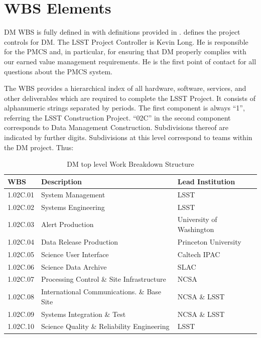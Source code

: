 \section{WBS Elements } \label{sect:WBS}

DM WBS is fully defined in  with definitions provided in . 
 defines the project controls for DM. The LSST Project Controller is Kevin Long. He is responsible for the PMCS and, in particular, for ensuring that DM properly complies with
our earned value management requirements. He is the first point of contact for
all questions about the PMCS system.


The WBS provides a hierarchical index of all hardware, software, services, and
other deliverables which are required to complete the LSST Project. It
consists of alphanumeric strings separated by periods. The first component is
always “1”, referring the LSST Construction Project. “02C” in the second
component corresponds to Data Management Construction. Subdivisions thereof
are indicated by further digits. Subdivisions at this level correspond to
teams within the DM project. Thus:

\begin{table}
\caption{DM top level Work Breakdown Structure \label{tab:wbs}}
\begin{tabular}[htb]{l|l|l}\\ \hline
{\bf WBS}    &  {\bf Description}   &                            {\bf Lead Institution}\\ \hline
	1.02C.01& System Management                       &  LSST\\ \hline
	1.02C.02& Systems Engineering                     &  LSST\\ \hline
	1.02C.03& Alert Production                        &  University of Washington\\ \hline
	1.02C.04& Data Release Production                 &  Princeton University\\ \hline
	1.02C.05& Science User Interface                  &  Caltech IPAC\\ \hline
	1.02C.06& Science Data Archive                    &  SLAC\\ \hline
	1.02C.07& Processing Control \& Site Infrastructure & NCSA\\ \hline
	1.02C.08& International Communications. \& Base Site& NCSA \& LSST\\ \hline
	1.02C.09& Systems Integration \& Test               & NCSA \& LSST\\ \hline
	1.02C.10& Science Quality \& Reliability Engineering& LSST\\ \hline
\end{tabular}
\end{table}


